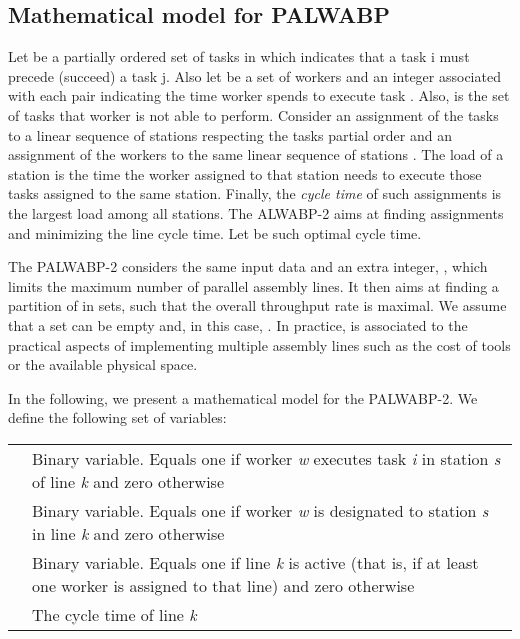 \documentclass{singlecol-new}
\begin{document}
\subsection{Mathematical model for PALWABP}

Let  be a partially ordered set of tasks in which  indicates that a task i must precede (succeed) a task j.  Also let  be a set of workers and  an integer associated with each pair  indicating the time worker  spends to execute task . Also,  is the set of tasks that worker  is not able to perform. Consider an assignment   of the tasks to a linear sequence of stations  respecting the tasks partial order and an assignment  of the workers to the same linear sequence of stations . The load of a station is the time the worker assigned to that station needs to execute those tasks assigned to the same station. Finally, the \emph{cycle time} of such  assignments is the largest load among all stations. The ALWABP-2 aims at finding assignments  and  minimizing the line cycle time. Let  be such optimal cycle time.
 
The PALWABP-2 considers the same input data and an extra integer, , which limits the maximum number of parallel assembly lines. It then aims at finding a partition of  in   sets, such that the overall throughput rate  is maximal. We assume that a set  can be empty and, in this case, . In practice,  is associated to the practical aspects of implementing multiple assembly lines such as the cost of tools or the available physical space.

In the following, we present a mathematical model for the PALWABP-2.  We define the following set of variables:

\vspace{0.2cm}

\begin{tabular}[t]{lp{10cm}}
 & Binary variable. Equals one if worker \textit{w} executes task \textit{i} in station \textit{s} of line \textit{k} and zero otherwise \\
 & Binary variable. Equals one if worker \textit{w} is designated to station \textit{s} in line \textit{k} and zero otherwise\\
 & Binary variable. Equals one if line \textit{k} is active (that is, if at least one worker is assigned to that line) and zero otherwise \\
 & The cycle time of line \textit{k}\\
\end{tabular}
\end{document}
